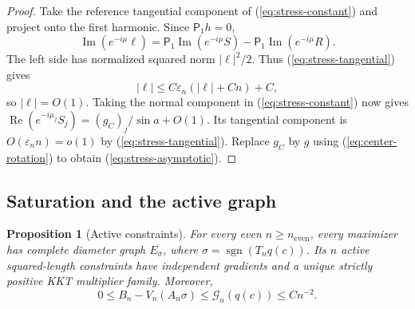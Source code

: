 \documentclass[11pt,reqno]{amsart}
\numberwithin{equation}{section}
\newtheorem{proposition}[theorem]{Proposition}
\theoremstyle{definition}
\theoremstyle{remark}
\DeclareMathOperator{\sgn}{sgn}
\newcommand{\Rea}{\operatorname{Re}}
\newcommand{\Ima}{\operatorname{Im}}
\begin{document}
\begin{proof}
Take the reference tangential component of (\ref{eq:stress-constant}) and project onto the first harmonic. Since $\mathsf P_1h=0$,
\[
 \Ima(e^{-i\mu}\ell)
 =\mathsf P_1\Ima(e^{-i\mu}S)-\mathsf P_1\Ima(e^{-i\mu}R).
\]
The left side has normalized squared norm $|\ell|^2/2$. Thus (\ref{eq:stress-tangential}) gives
\[
 |\ell|\le C\varepsilon_n(|\ell|+Cn)+C,
\]
so $|\ell|=O(1)$. Taking the normal component in (\ref{eq:stress-constant}) now gives $\Rea(e^{-i\mu_j}S_j)=(g_C)_j/\sin a+O(1)$. Its tangential component is $O(\varepsilon_n n)=o(1)$ by (\ref{eq:stress-tangential}). Replace $g_C$ by $g$ using (\ref{eq:center-rotation}) to obtain (\ref{eq:stress-asymptotic}).
\end{proof}

\subsection{Saturation and the active graph}
\begin{proposition}[Active constraints]\label{prop:active}
For every even $n\ge n_{\mathrm{even}}$, every maximizer has complete diameter graph $E_\sigma$, where $\sigma=\sgn(T_nq(c))$. Its $n$ active squared-length constraints have independent gradients and a unique strictly positive KKT multiplier family. Moreover,
\[
 0\le B_n-V_n(A_n\sigma)\le\mathscr G_n(q(c))\le Cn^{-2}.
\]
\end{proposition}
\end{document}
